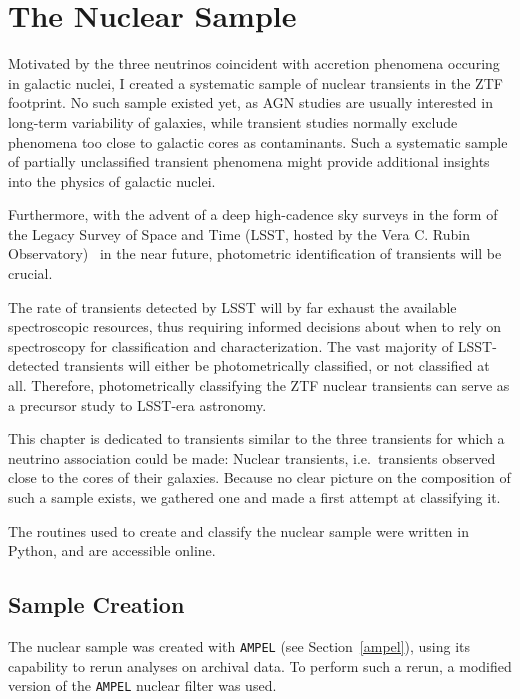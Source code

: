 \chapter{The Nuclear Sample}\label{nucsam}
Motivated by the three neutrinos coincident with accretion phenomena occuring in galactic nuclei, I created a systematic sample of nuclear transients in the ZTF footprint. No such sample existed yet, as AGN studies are usually interested in long-term variability of galaxies, while transient studies normally exclude phenomena too close to galactic cores as contaminants. Such a systematic sample of partially unclassified transient phenomena might provide additional insights into the physics of galactic nuclei.

Furthermore, with the advent of a deep high-cadence sky surveys in the form of the Legacy Survey of Space and Time (LSST, hosted by the Vera C. Rubin Observatory)~ in the near future, photometric identification of transients will be crucial.

The rate of transients detected by LSST will by far exhaust the available spectroscopic resources, thus requiring informed decisions about when to rely on spectroscopy for classification and characterization. The vast majority of LSST-detected transients will either be photometrically classified, or not classified at all. Therefore, photometrically classifying the ZTF nuclear transients can serve as a precursor study to LSST-era astronomy.

This chapter is dedicated to transients similar to the three transients for which a neutrino association could be made: Nuclear transients, i.e.~transients observed close to the cores of their galaxies. Because no clear picture on the composition of such a sample exists, we gathered one and made a first attempt at classifying it.

The routines used to create and classify the nuclear sample were written in Python, and are accessible online.

\section{Sample Creation}
The nuclear sample was created with \texttt{AMPEL} (see Section~\ref{ampel}), using its capability to rerun analyses on archival data. To perform such a rerun, a modified version of the \texttt{AMPEL} nuclear filter was used.

